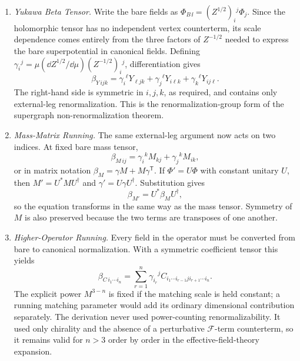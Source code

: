 \begin{enumerate}
  \begin{enumerate}
    \item \emph{Yukawa Beta Tensor.}
    Write the bare fields as
      \(\Phi_{B\,\ii}=(Z^{1/2})_i{}^j\Phi_j\).  Since the holomorphic tensor
      has no independent vertex counterterm, its scale dependence comes
      entirely from the three factors of \(Z^{-1/2}\) needed to express the
      bare superpotential in canonical fields.  Defining
      \(\gamma_i{}^j=\mu(\dd Z^{1/2}/\dd\mu)(Z^{-1/2})_i{}^j\), differentiation
      gives
      \[
        \beta_{Y\,ijk}
          =\gamma_i{}^\ell Y_{\ell jk}
           +\gamma_j{}^\ell Y_{i\ell k}
           +\gamma_k{}^\ell Y_{ij\ell}.
      \]
      The right-hand side is symmetric in \(i,j,k\), as required, and
      contains only external-leg renormalization.  This is the
      renormalization-group form of the supergraph non-renormalization
      theorem.
    \item \emph{Mass-Matrix Running.}
    The same external-leg argument now acts on two indices.  At fixed bare
      mass tensor,
      \[
        \beta_{M\,ij}
          =\gamma_i{}^kM_{kj}+\gamma_j{}^kM_{ik},
      \]
      or in matrix notation
      \(\beta_M=\gamma M+M\gamma^{\mathsf T}\).  If
      \(\Phi'=U\Phi\) with constant unitary \(U\), then
      \(M'=U^*MU^\dagger\) and
      \(\gamma'=U\gamma U^\dagger\).  Substitution gives
      \[
        \beta_{M'}=U^*\beta_MU^\dagger,
      \]
      so the equation transforms in the same way as the mass tensor.
      Symmetry of \(M\) is also preserved because the two terms are
      transposes of one another.
    \item \emph{Higher-Operator Running.}
    Every field in the operator must be converted from bare to canonical
      normalization.  With a symmetric coefficient tensor this yields
      \[
        \beta_{C\,i_1\cdots i_n}
          =\sum_{r=1}^{n}
           \gamma_{i_r}{}^j
           C_{i_1\cdots i_{r-1}j i_{r+1}\cdots i_n}.
      \]
      The explicit power \(M^{3-n}\) is fixed if the matching scale is held
      constant; a running matching parameter would add its ordinary
      dimensional contribution separately.  The derivation never used
      power-counting renormalizability.  It used only chirality and the
      absence of a perturbative \(\mathcal F\)-term counterterm, so it
      remains valid for \(n>3\) order by order in the effective-field-theory
      expansion.
  \end{enumerate}


\end{enumerate}
